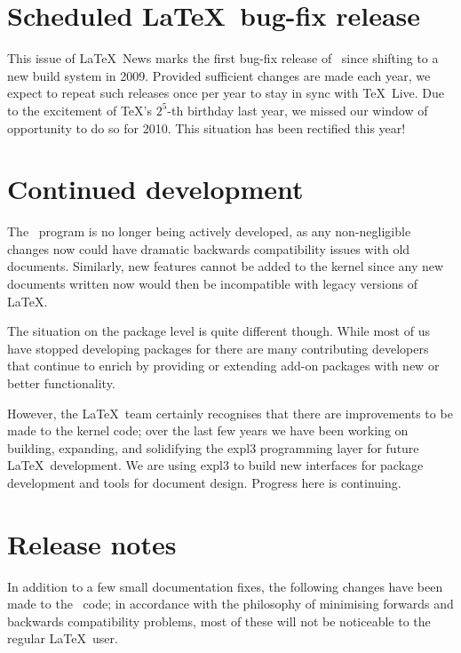 \documentclass{ltnews}
\begin{document}
\maketitle

\section{Scheduled \LaTeX\ bug-fix release}

This issue of \LaTeX~News marks the first bug-fix release of
\LaTeXe\ since shifting to a new build system in 2009.
Provided sufficient changes are made each year, we expect to
repeat such releases once per year to stay in sync with \TeX\ Live.
Due to the excitement of \TeX's $2^5$-th birthday last year,
we missed our window of opportunity to do so for 2010.
This situation has been rectified this year!

\section{Continued development}

The \LaTeXe\ program is no longer being actively developed, as any non-negligible changes now could have dramatic backwards compatibility issues with old documents. Similarly, new features cannot be added to the kernel since any new documents written now would then be incompatible with legacy versions of \LaTeX.

The situation on the package level is quite different though. While most of us have stopped developing packages for \LaTeXe{} there are many contributing developers that continue to enrich \LaTeXe{} by providing or extending add-on packages with new or better functionality.

However, the \LaTeX\ team certainly recognises that there are improvements to be made to the kernel code; over the last few years we have been working on building, expanding, and solidifying the \textsf{expl3} programming layer for future \LaTeX\ development. We are using \textsf{expl3} to build new interfaces for package development and tools for document design. Progress here is continuing.

\section{Release notes}

In addition to a few small documentation fixes, the following changes have been made to the \LaTeXe\ code; in accordance with the philosophy of minimising forwards and backwards compatibility problems, most of these will not be noticeable to the regular \LaTeX\ user.
\end{document}
